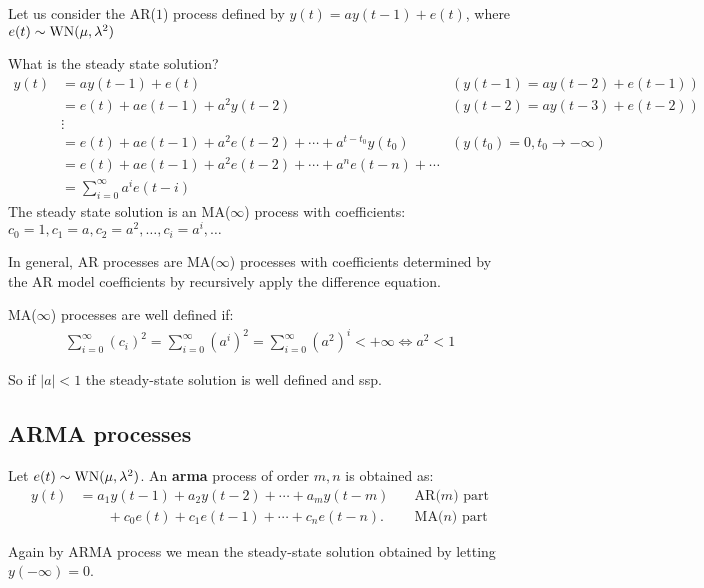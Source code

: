\begin{exa}
Let us consider the AR($1$) process defined by $y(t)=a y(t-1)+e(t)$, where $e(t) \sim \operatorname{WN}(\mu, \lambda^{2})$

What is the steady state solution?
\begin{align*}
	y(t) & =a y(t-1)+e(t) & (y(t-1)=a y(t-2)+e(t-1)) \\
	& =e(t)+a e(t-1)+a^{2} y(t-2) & (y(t-2)=a y(t-3)+e(t-2)) \\
	& \vdots & \\
	& =e(t)+a e(t-1)+a^{2} e(t-2)+\cdots+a^{t-t_{0}} y\left(t_{0}\right) & (y\left(t_{0}\right)=0,t_{0} \to-\infty) \\
	& =e(t)+a e(t-1)+a^{2} e(t-2)+\cdots+a^{n} e(t-n)+\cdots\\
	&=\sum_{i=0}^{\infty} a^{i} e(t-i)
\end{align*}
The steady state solution is an MA($\infty$) process with coefficients: $c_{0}=1, c_{1}=a, c_{2}=a^{2}, \ldots, c_{i}=a^{i}, \ldots$

In general, AR processes are MA($\infty$) processes with coefficients determined by the AR model coefficients by recursively apply the difference equation.

MA($\infty$) processes are well defined if:
\begin{align*}
	\sum_{i=0}^{\infty} \left(c_{i}\right)^2=\sum_{i=0}^{\infty} \left(a^{i}\right)^2=\sum_{i=0}^{\infty} \left(a^{2}\right)^i< +\infty \iff a^2< 1
\end{align*}

So if $|a|<1$ the steady-state solution is well defined and \gls{ssp}.
\end{exa}

\subsection{ARMA processes}

\begin{defn}
	Let $e(t) \sim \operatorname{WN}(\mu, \lambda^{2})$. An \textbf{\gls{arma}} process of order $m,n$ is obtained as:
	\[
		\boxed{
			\begin{aligned}
				y(t)&=a_{1} y(t-1)+a_{2} y(t-2)+\cdots+a_{m} y(t-m)\quad & \text{AR($m$) part}\\
				&\qquad+c_{0} e(t)+c_{1} e(t-1)+\cdots+c_{n} e(t-n) . \quad & \text{MA($n$) part}
			\end{aligned}
		}
	\]
\end{defn}

Again by ARMA process we mean the steady-state solution obtained by letting $y(-\infty)=0$.
 
